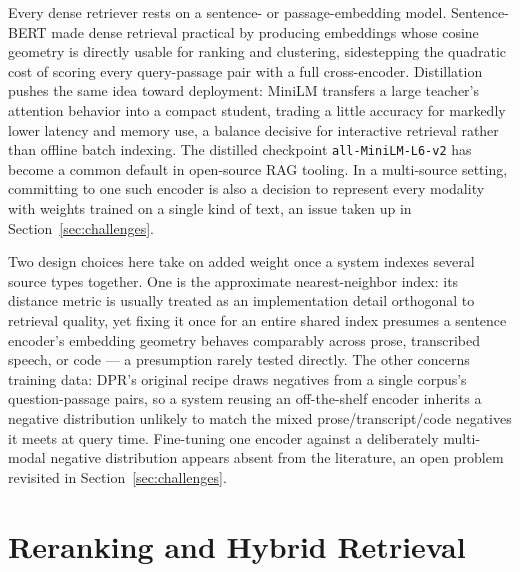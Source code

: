 \documentclass[conference]{IEEEtran}
\begin{document}
Every dense retriever rests on a sentence- or passage-embedding model. Sentence-BERT \cite{reimers2019sbert} made dense retrieval practical by producing embeddings whose cosine geometry is directly usable for ranking and clustering, sidestepping the quadratic cost of scoring every query-passage pair with a full cross-encoder. Distillation pushes the same idea toward deployment: MiniLM \cite{wang2020minilm,wang2020minilmv2} transfers a large teacher's attention behavior into a compact student, trading a little accuracy for markedly lower latency and memory use, a balance decisive for interactive retrieval rather than offline batch indexing. The distilled checkpoint \texttt{all-MiniLM-L6-v2} \cite{minilm_modelcard} has become a common default in open-source RAG tooling. In a multi-source setting, committing to one such encoder is also a decision to represent every modality with weights trained on a single kind of text, an issue taken up in Section~\ref{sec:challenges}.

Two design choices here take on added weight once a system indexes several source types together. One is the approximate nearest-neighbor index: its distance metric is usually treated as an implementation detail orthogonal to retrieval quality, yet fixing it once for an entire shared index presumes a sentence encoder's embedding geometry behaves comparably across prose, transcribed speech, or code — a presumption rarely tested directly. The other concerns training data: DPR's original recipe \cite{karpukhin2020dpr} draws negatives from a single corpus's question-passage pairs, so a system reusing an off-the-shelf encoder inherits a negative distribution unlikely to match the mixed prose/transcript/code negatives it meets at query time. Fine-tuning one encoder against a deliberately multi-modal negative distribution appears absent from the literature, an open problem revisited in Section~\ref{sec:challenges}.

\section{Reranking and Hybrid Retrieval}
\label{sec:reranking}
\end{document}
